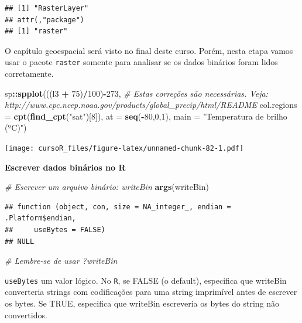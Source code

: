 \documentclass[]{book}
\newenvironment{Shaded}{\begin{snugshade}}{\end{snugshade}}
\newcommand{\KeywordTok}[1]{\textcolor[rgb]{0.13,0.29,0.53}{\textbf{#1}}}
\newcommand{\DataTypeTok}[1]{\textcolor[rgb]{0.13,0.29,0.53}{#1}}
\newcommand{\DecValTok}[1]{\textcolor[rgb]{0.00,0.00,0.81}{#1}}
\newcommand{\StringTok}[1]{\textcolor[rgb]{0.31,0.60,0.02}{#1}}
\newcommand{\CommentTok}[1]{\textcolor[rgb]{0.56,0.35,0.01}{\textit{#1}}}
\newcommand{\OperatorTok}[1]{\textcolor[rgb]{0.81,0.36,0.00}{\textbf{#1}}}
\newcommand{\NormalTok}[1]{#1}
\theoremstyle{definition}
\theoremstyle{definition}
\theoremstyle{definition}
\theoremstyle{remark}
\begin{document}
\begin{verbatim}
## [1] "RasterLayer"
## attr(,"package")
## [1] "raster"
\end{verbatim}

O capítulo geoespacial será visto no final deste curso. Porém, nesta
etapa vamos usar o pacote \texttt{raster} somente para analisar se os
dados binários foram lidos corretamente.

\begin{Shaded}
\begin{Highlighting}[]
\NormalTok{sp}\OperatorTok{::}\KeywordTok{spplot}\NormalTok{(((l3 }\OperatorTok{+}\StringTok{ }\DecValTok{75}\NormalTok{)}\OperatorTok{/}\DecValTok{100}\NormalTok{)}\OperatorTok{-}\DecValTok{273}\NormalTok{, }\CommentTok{# Estas correções são necessárias. Veja: http://www.cpc.ncep.noaa.gov/products/global_precip/html/README}
           \DataTypeTok{col.regions =} \KeywordTok{cpt}\NormalTok{(}\KeywordTok{find_cpt}\NormalTok{(}\StringTok{"sat"}\NormalTok{)[}\DecValTok{8}\NormalTok{]),}
           \DataTypeTok{at =} \KeywordTok{seq}\NormalTok{(}\OperatorTok{-}\DecValTok{80}\NormalTok{,}\DecValTok{0}\NormalTok{,}\DecValTok{1}\NormalTok{),}
           \DataTypeTok{main =} \StringTok{"Temperatura de brilho (ºC)"}\NormalTok{) }
\end{Highlighting}
\end{Shaded}

\texttt{[image: cursoR\_files/figure-latex/unnamed-chunk-82-1.pdf]}

\textbf{Escrever dados binários no R}

\begin{Shaded}
\begin{Highlighting}[]
\CommentTok{# Escrever um arquivo binário: writeBin}
\KeywordTok{args}\NormalTok{(writeBin)}
\end{Highlighting}
\end{Shaded}

\begin{verbatim}
## function (object, con, size = NA_integer_, endian = .Platform$endian, 
##     useBytes = FALSE) 
## NULL
\end{verbatim}

\begin{Shaded}
\begin{Highlighting}[]
\CommentTok{# Lembre-se de usar ?writeBin}
\end{Highlighting}
\end{Shaded}

\texttt{useBytes} um valor lógico. No \texttt{R}, se FALSE (o default),
especifica que writeBin converteria strings com codificações para uma
string imprimível antes de escrever os bytes. Se TRUE, especifica que
writeBin escreveria os bytes do string não convertidos.
\end{document}
